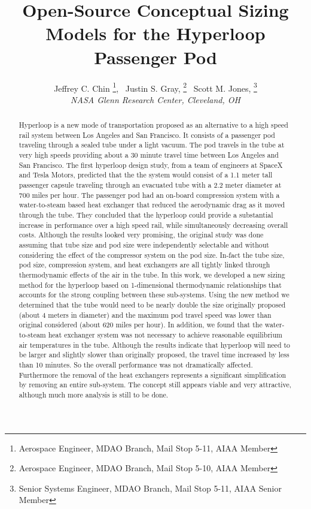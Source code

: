 \documentclass[]             %
{aiaa-tc}                       %
\title{Open-Source Conceptual Sizing Models for the Hyperloop Passenger Pod}
\author{
  Jeffrey C. Chin%
     \thanks{Aerospace Engineer, MDAO Branch, Mail Stop 5-11, AIAA Member},
  \ Justin S. Gray,%
     \thanks{Aerospace Engineer, MDAO Branch, Mail Stop 5-10, AIAA Member}
  \ Scott M. Jones,%
     \thanks{Senior Systems Engineer, MDAO Branch, Mail Stop 5-11, AIAA Senior Member}
   \\
  {\normalsize\itshape
  NASA Glenn Research Center, Cleveland, OH}
}
\begin{document}
\maketitle

\begin{abstract}
Hyperloop is a new mode of transportation proposed as an alternative to a high speed rail system between Los Angeles and San Francisco. It consists of a passenger pod traveling through a sealed tube under a light vacuum. The pod travels in the tube at very high speeds providing about a 30 minute travel time between Los Angeles and San Francisco. The first hyperloop design study, from a team of engineers at SpaceX and Tesla Motors, predicted that the the system would consist of a 1.1 meter tall passenger capsule traveling through an evacuated tube with a 2.2 meter diameter at 700 miles per hour. The passenger pod had an on-board compression system with a water-to-steam based heat exchanger  that reduced the aerodynamic drag as it moved through the tube. They concluded that the hyperloop could provide a substantial increase in performance over a high speed rail, while simultaneously decreasing overall costs. Although the results looked very promising, the original study was done assuming that tube size and pod size were independently selectable and without considering the effect of the compressor system on the pod size. In-fact the tube size, pod size, compression system, and heat exchangers are all tightly linked through thermodynamic effects of the air in the tube. In this work, we developed a new sizing method for the hyperloop based on 1-dimensional thermodynamic relationships that accounts for the strong coupling between these sub-systems. Using the new method we determined that the tube would need to be nearly double the size originally proposed (about 4 meters in diameter) and the maximum pod travel speed was lower than original considered (about 620 miles per hour). In addition, we found that the water-to-steam heat exchanger system was not necessary to achieve reasonable equilibrium air temperatures in the tube. Although the results indicate that hyperloop will need to be larger and slightly slower than originally proposed, the travel time increased by less than 10 minutes. So the overall performance was not dramatically affected. Furthermore the removal of the heat exchangers represents a significant simplification by removing an entire sub-system. The concept still appears viable and very attractive, although much more analysis is still to be done. 


\end{abstract}  

\setcounter{secnumdepth}{1}
\setcounter{tocdepth}{1}
\printnomenclature
 





\end{document}
